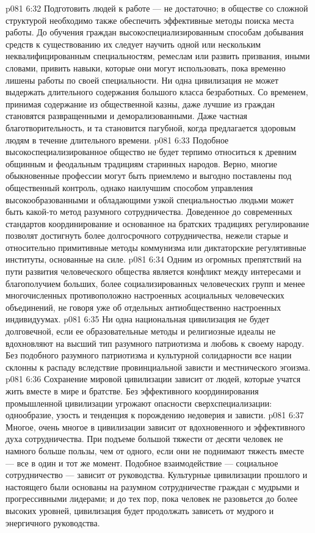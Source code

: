 \vs p081 6:32 Подготовить людей к работе --- не достаточно; в обществе со сложной структурой необходимо также обеспечить эффективные методы поиска места работы. До обучения граждан высокоспециализированным способам добывания средств к существованию их следует научить одной или нескольким неквалифицированным специальностям, ремеслам или развить призвания, иными словами, привить навыки, которые они могут использовать, пока временно лишены работы по своей специальности. Ни одна цивилизация не может выдержать длительного содержания большого класса безработных. Со временем, принимая содержание из общественной казны, даже лучшие из граждан становятся развращенными и деморализованными. Даже частная благотворительность, и та становится пагубной, когда предлагается здоровым людям в течение длительного времени.
\vs p081 6:33 Подобное высокоспециализированное общество не будет терпимо относиться к древним общинным и феодальным традициям старинных народов. Верно, многие обыкновенные профессии могут быть приемлемо и выгодно поставлены под общественный контроль, однако наилучшим способом управления высокообразованными и обладающими узкой специальностью людьми может быть какой\hyp{}то метод разумного сотрудничества. Доведенное до современных стандартов координирование и основанное на братских традициях регулирование позволят достигнуть более долгосрочного сотрудничества, нежели старые и относительно примитивные методы коммунизма или диктаторские регулятивные институты, основанные на силе.
\vs p081 6:34 \pc {}\bibnobreakspace {} Одним из огромных препятствий на пути развития человеческого общества является конфликт между интересами и благополучием больших, более социализированных человеческих групп и менее многочисленных противоположно настроенных асоциальных человеческих объединений, не говоря уже об отдельных антиобщественно настроенных индивидуумах.
\vs p081 6:35 Ни одна национальная цивилизация не будет долговечной, если ее образовательные методы и религиозные идеалы не вдохновляют на высший тип разумного патриотизма и любовь к своему народу. Без подобного разумного патриотизма и культурной солидарности все нации склонны к распаду вследствие провинциальной зависти и местнического эгоизма.
\vs p081 6:36 Сохранение мировой цивилизации зависит от людей, которые учатся жить вместе в мире и братстве. Без эффективного координирования промышленной цивилизации угрожают опасности сверхспециализации: однообразие, узость и тенденция к порождению недоверия и зависти.
\vs p081 6:37 \pc {}\bibnobreakspace {} Многое, очень многое в цивилизации зависит от вдохновенного и эффективного духа сотрудничества. При подъеме большой тяжести от десяти человек не намного больше пользы, чем от одного, если они не поднимают тяжесть вместе --- все в один и тот же момент. Подобное взаимодействие --- социальное сотрудничество --- зависит от руководства. Культурные цивилизации прошлого и настоящего были основаны на разумном сотрудничестве граждан с мудрыми и прогрессивными лидерами; и до тех пор, пока человек не разовьется до более высоких уровней, цивилизация будет продолжать зависеть от мудрого и энергичного руководства.
